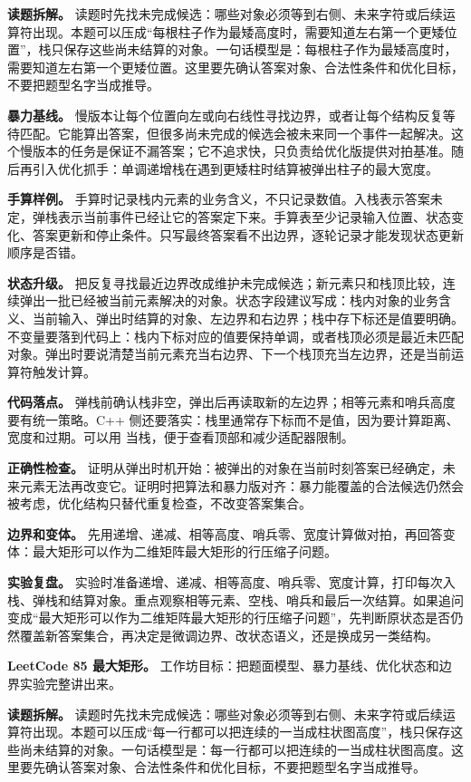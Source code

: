 \textbf{读题拆解。} 读题时先找未完成候选：哪些对象必须等到右侧、未来字符或后续运算符出现。本题可以压成“每根柱子作为最矮高度时，需要知道左右第一个更矮位置”，栈只保存这些尚未结算的对象。一句话模型是：每根柱子作为最矮高度时，需要知道左右第一个更矮位置。这里要先确认答案对象、合法性条件和优化目标，不要把题型名字当成推导。

\textbf{暴力基线。} 慢版本让每个位置向左或向右线性寻找边界，或者让每个结构反复等待匹配。它能算出答案，但很多尚未完成的候选会被未来同一个事件一起解决。这个慢版本的任务是保证不漏答案；它不追求快，只负责给优化版提供对拍基准。随后再引入优化抓手：单调递增栈在遇到更矮柱时结算被弹出柱子的最大宽度。

\textbf{手算样例。} 手算时记录栈内元素的业务含义，不只记录数值。入栈表示答案未定，弹栈表示当前事件已经让它的答案定下来。手算表至少记录输入位置、状态变化、答案更新和停止条件。只写最终答案看不出边界，逐轮记录才能发现状态更新顺序是否错。

\textbf{状态升级。} 把反复寻找最近边界改成维护未完成候选；新元素只和栈顶比较，连续弹出一批已经被当前元素解决的对象。状态字段建议写成：栈内对象的业务含义、当前输入、弹出时结算的对象、左边界和右边界；栈中存下标还是值要明确。不变量要落到代码上：栈内下标对应的值要保持单调，或者栈顶必须是最近未匹配对象。弹出时要说清楚当前元素充当右边界、下一个栈顶充当左边界，还是当前运算符触发计算。

\textbf{代码落点。} 弹栈前确认栈非空，弹出后再读取新的左边界；相等元素和哨兵高度要有统一策略。C++ 侧还要落实：栈里通常存下标而不是值，因为要计算距离、宽度和过期。可以用  当栈，便于查看顶部和减少适配器限制。

\textbf{正确性检查。} 证明从弹出时机开始：被弹出的对象在当前时刻答案已经确定，未来元素无法再改变它。证明时把算法和暴力版对齐：暴力能覆盖的合法候选仍然会被考虑，优化结构只替代重复检查，不改变答案集合。

\textbf{边界和变体。} 先用递增、递减、相等高度、哨兵零、宽度计算做对拍，再回答变体：最大矩形可以作为二维矩阵最大矩形的行压缩子问题。

\textbf{实验复盘。} 实验时准备递增、递减、相等高度、哨兵零、宽度计算，打印每次入栈、弹栈和结算对象。重点观察相等元素、空栈、哨兵和最后一次结算。如果追问变成“最大矩形可以作为二维矩阵最大矩形的行压缩子问题”，先判断原状态是否仍然覆盖新答案集合，再决定是微调边界、改状态语义，还是换成另一类结构。

\noindent\textbf{LeetCode 85 最大矩形。} 工作坊目标：把题面模型、暴力基线、优化状态和边界实验完整讲出来。

\textbf{读题拆解。} 读题时先找未完成候选：哪些对象必须等到右侧、未来字符或后续运算符出现。本题可以压成“每一行都可以把连续的一当成柱状图高度”，栈只保存这些尚未结算的对象。一句话模型是：每一行都可以把连续的一当成柱状图高度。这里要先确认答案对象、合法性条件和优化目标，不要把题型名字当成推导。

